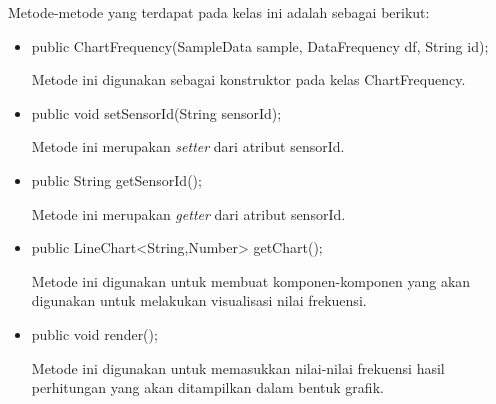 Metode-metode yang terdapat pada kelas ini adalah sebagai berikut:
\begin{itemize}
    \item public ChartFrequency(SampleData sample, DataFrequency df, String id);
    
    Metode ini digunakan sebagai konstruktor pada kelas ChartFrequency.
    
    \item public void setSensorId(String sensorId);
    
    Metode ini merupakan \textit{setter} dari atribut sensorId.
    
    \item public String getSensorId();
    
    Metode ini merupakan \textit{getter} dari atribut sensorId.
    
    \item public LineChart<String,Number> getChart();
    
    Metode ini digunakan untuk membuat komponen-komponen yang akan digunakan untuk melakukan visualisasi nilai frekuensi.
    
    \item public void render();
    
    Metode ini digunakan untuk memasukkan nilai-nilai frekuensi hasil perhitungan yang akan ditampilkan dalam bentuk grafik.

\end{itemize}


